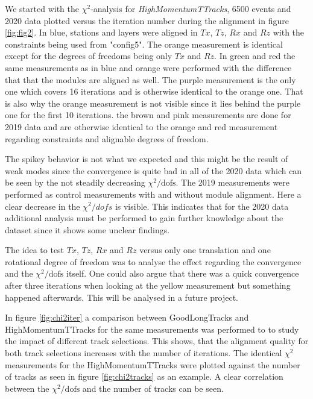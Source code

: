 We started with the $\chi^2$-analysis for \textit{HighMomentumTTracks},
6500 events and 2020 data plotted versus the iteration number during the
alignment in figure \ref{fig:fig2}. In blue, stations and layers were aligned in $Tx$,
$Tz$, $Rx$ and $Rz$ with the constraints being used from "config5". The orange
measurement is identical except for the degrees of freedoms being only $Tx$ and $Rz$.
In green and red the same measurements as in blue and orange were performed with
the difference that that the modules are aligned as well.
The purple measurement is the only one which covers 16 iterations and is otherwise identical to the orange one. That is also why the orange measurement is not visible since it lies behind the purple one for the first 10 iterations.
the brown and pink measurements are done for 2019 data and are otherwise identical to the orange and red measurement regarding constraints and alignable degrees of freedom.

The spikey behavior is not what we expected and this might be the result of weak modes since the convergence is quite bad in all of the 2020 data which can be seen by the not
steadily decreasing $\chi^2 / \text{dofs}$.
The 2019 measurements were performed as control measurements with and without
module alignment. Here a clear decrease in the $\chi^2 / dofs$ is visible. This
indicates that for the 2020 data additional analysis must be performed to gain further knowledge about the dataset since it shows some unclear findings.

The idea to test $Tx$, $Tz$, $Rx$ and $Rz$ versus only one translation and one
rotational degree of freedom was to analyse the effect regarding the convergence and the $\chi^2 / \text{dofs}$ itself. One could also argue that there was a quick convergence after three iterations when looking at the yellow measurement but something happened afterwards. This will be analysed in a future project.

In figure \ref{fig:chi2iter} a comparison between GoodLongTracks and HighMomentumTTracks for the same measurements was performed to to study the impact of different track selections. This shows, that the alignment quality for both track selections increases with the number of iterations.
The identical $\chi^2$ measurements for the HighMomentumTTracks were plotted against the number of tracks as seen in figure \ref{fig:chi2tracks} as an example.
A clear correlation between the $\chi^2 / \text{dofs}$ and the number of tracks can be seen.

